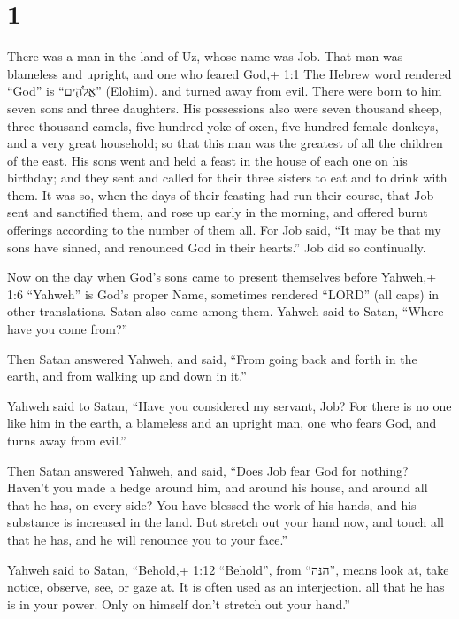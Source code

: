 \hypertarget{section}{%
\section{1}\label{section}}

 There was a man in the land of Uz, whose name was Job. That
man was blameless and upright, and one who feared God,+ 1:1 The Hebrew
word rendered ``God'' is ``אֱלֹהִ֑ים'' (Elohim). and turned away from
evil.  There were born to him seven sons and three
daughters.  His possessions also were seven thousand sheep,
three thousand camels, five hundred yoke of oxen, five hundred female
donkeys, and a very great household; so that this man was the greatest
of all the children of the east.  His sons went and held a
feast in the house of each one on his birthday; and they sent and called
for their three sisters to eat and to drink with them.  It
was so, when the days of their feasting had run their course, that Job
sent and sanctified them, and rose up early in the morning, and offered
burnt offerings according to the number of them all. For Job said, ``It
may be that my sons have sinned, and renounced God in their hearts.''
Job did so continually.

 Now on the day when God's sons came to present themselves
before Yahweh,+ 1:6 ``Yahweh'' is God's proper Name, sometimes rendered
``LORD'' (all caps) in other translations. Satan also came among them.
 Yahweh said to Satan, ``Where have you come from?''

Then Satan answered Yahweh, and said, ``From going back and forth in the
earth, and from walking up and down in it.''

 Yahweh said to Satan, ``Have you considered my servant,
Job? For there is no one like him in the earth, a blameless and an
upright man, one who fears God, and turns away from evil.''

 Then Satan answered Yahweh, and said, ``Does Job fear God
for nothing?  Haven't you made a hedge around him, and
around his house, and around all that he has, on every side? You have
blessed the work of his hands, and his substance is increased in the
land.  But stretch out your hand now, and touch all that he
has, and he will renounce you to your face.''

 Yahweh said to Satan, ``Behold,+ 1:12 ``Behold'', from
``הִנֵּה'', means look at, take notice, observe, see, or gaze at. It is
often used as an interjection. all that he has is in your power. Only on
himself don't stretch out your hand.''

